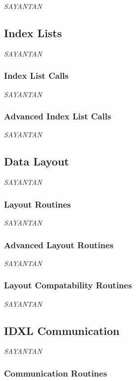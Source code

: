{\it SAYANTAN}

\subsection{Index Lists}
\label{sec:IDXL}

{\it SAYANTAN}

\subsubsection{Index List Calls}

{\it SAYANTAN}

\subsubsection{Advanced Index List Calls}

{\it SAYANTAN}

\subsection{Data Layout}

{\it SAYANTAN}

\subsubsection{Layout Routines}

{\it SAYANTAN}

\subsubsection{Advanced Layout Routines}
\label{sec:IDXLLayoutoffset}

{\it SAYANTAN}

\subsubsection{Layout Compatability Routines}

{\it SAYANTAN}

\subsection{IDXL Communication}
\label{sec:IDXLComm}

{\it SAYANTAN}

\subsubsection{Communication Routines}

